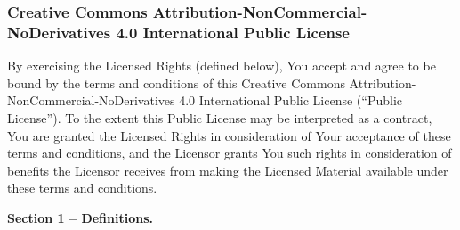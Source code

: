 \subsubsection{Creative Commons Attribution-NonCommercial-NoDerivatives 4.0 International Public License}
\par By exercising the Licensed Rights (defined below), You accept and agree to be bound by the terms and conditions of this Creative Commons Attribution-NonCommercial-NoDerivatives 4.0 International Public License (``Public License''). To the extent this Public License may be interpreted as a contract, You are granted the Licensed Rights in consideration of Your acceptance of these terms and conditions, and the Licensor grants You such rights in consideration of benefits the Licensor receives from making the Licensed Material available under these terms and conditions.
\par \textbf{Section 1 – Definitions.}

